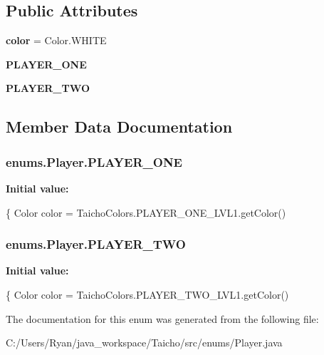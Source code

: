 \subsection*{Public Attributes}
\begin{DoxyCompactItemize}
\item 
\hypertarget{enumenums_1_1_player_af7d305334f795f880c5c6e3a63487c3e}{{\bfseries color} = Color.\-W\-H\-I\-T\-E}\label{enumenums_1_1_player_af7d305334f795f880c5c6e3a63487c3e}

\item 
{\bfseries P\-L\-A\-Y\-E\-R\-\_\-\-O\-N\-E}
\item 
{\bfseries P\-L\-A\-Y\-E\-R\-\_\-\-T\-W\-O}
\end{DoxyCompactItemize}


\subsection{Member Data Documentation}
\hypertarget{enumenums_1_1_player_aa11f302cdf6dea1a744ee529db0f0afe}{
\subsubsection[{P\-L\-A\-Y\-E\-R\-\_\-\-O\-N\-E}]{\setlength{\rightskip}{0pt plus 5cm}enums.\-Player.\-P\-L\-A\-Y\-E\-R\-\_\-\-O\-N\-E}}\label{enumenums_1_1_player_aa11f302cdf6dea1a744ee529db0f0afe}
{\bfseries Initial value\-:}
\begin{DoxyCode}
\{
        Color color = TaichoColors.PLAYER\_ONE\_LVL1.getColor()
\end{DoxyCode}
\hypertarget{enumenums_1_1_player_a584bf4b0eceeeeccc4b9aed89ac4de89}{
\subsubsection[{P\-L\-A\-Y\-E\-R\-\_\-\-T\-W\-O}]{\setlength{\rightskip}{0pt plus 5cm}enums.\-Player.\-P\-L\-A\-Y\-E\-R\-\_\-\-T\-W\-O}}\label{enumenums_1_1_player_a584bf4b0eceeeeccc4b9aed89ac4de89}
{\bfseries Initial value\-:}
\begin{DoxyCode}
\{
        Color color = TaichoColors.PLAYER\_TWO\_LVL1.getColor()
\end{DoxyCode}


The documentation for this enum was generated from the following file\-:\begin{DoxyCompactItemize}
\item 
C\-:/\-Users/\-Ryan/java\-\_\-workspace/\-Taicho/src/enums/Player.\-java\end{DoxyCompactItemize}
